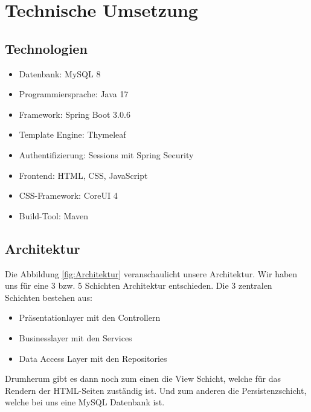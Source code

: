 \documentclass[12pt, letterpaper]{article}
\begin{document}
    \newpage
    \section{Technische Umsetzung}

    \subsection{Technologien}

    \begin{itemize}
        \item Datenbank: MySQL 8
        \item Programmiersprache: Java 17
        \item Framework: Spring Boot 3.0.6
        \item Template Engine: Thymeleaf
        \item Authentifizierung: Sessions mit Spring Security
        \item Frontend: HTML, CSS, JavaScript
        \item CSS-Framework: CoreUI 4
        \item Build-Tool: Maven
    \end{itemize}

    \newpage
    \subsection{Architektur}

    Die Abbildung \ref{fig:Architektur} veranschaulicht unsere Architektur. Wir haben uns für eine 3 bzw. 5 Schichten Architektur entschieden.
    Die 3 zentralen Schichten bestehen aus:
    \begin{itemize}
        \item Präsentationlayer mit den Controllern
        \item Businesslayer mit den Services
        \item Data Access Layer mit den Repositories
    \end{itemize}

    Drumherum gibt es dann noch zum einen die View Schicht, welche für das Rendern der HTML-Seiten zuständig ist. Und zum anderen
    die Persistenzschicht, welche bei uns eine MySQL Datenbank ist.
\end{document}
